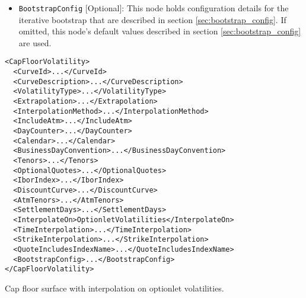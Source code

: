 \begin{itemize}
\item \lstinline!BootstrapConfig! [Optional]:
This node holds configuration details for the iterative bootstrap that are described in section \ref{sec:bootstrap_config}. If omitted, this node's default values described in section \ref{sec:bootstrap_config} are used.

\end{itemize}

\begin{longlisting}
\begin{verbatim}
<CapFloorVolatility>
  <CurveId>...</CurveId>
  <CurveDescription>...</CurveDescription>
  <VolatilityType>...</VolatilityType>
  <Extrapolation>...</Extrapolation>
  <InterpolationMethod>...</InterpolationMethod>
  <IncludeAtm>...</IncludeAtm>
  <DayCounter>...</DayCounter>
  <Calendar>...</Calendar>
  <BusinessDayConvention>...</BusinessDayConvention>
  <Tenors>...</Tenors>
  <OptionalQuotes>...</OptionalQuotes>
  <IborIndex>...</IborIndex>
  <DiscountCurve>...</DiscountCurve>
  <AtmTenors>...</AtmTenors>
  <SettlementDays>...</SettlementDays>
  <InterpolateOn>OptionletVolatilities</InterpolateOn>
  <TimeInterpolation>...</TimeInterpolation>
  <StrikeInterpolation>...</StrikeInterpolation>
  <QuoteIncludesIndexName>...</QuoteIncludesIndexName>
  <BootstrapConfig>...</BootstrapConfig>
</CapFloorVolatility>
\end{verbatim}
\caption{Cap floor surface with interpolation on optionlet volatilities.}
\label{lst:capfloorvol_surface_configuration_opt}
\end{longlisting}
